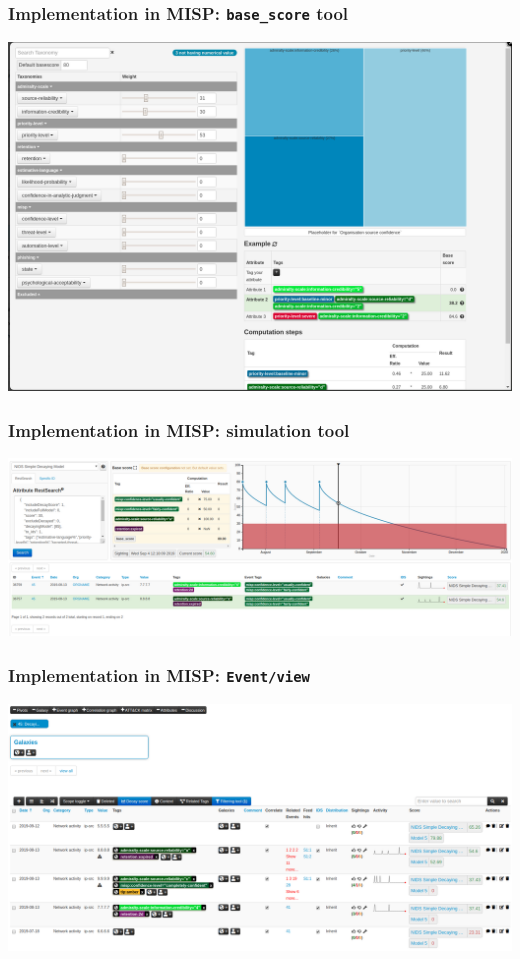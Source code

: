 \begin{frame}
    \frametitle{Implementation in MISP: \texttt{base\_score} tool}
    \includegraphics[width=1.00\linewidth]{pics/decaying-basescore.png}
\end{frame}

\begin{frame}
    \frametitle{Implementation in MISP: simulation tool}
    \includegraphics[width=1.00\linewidth]{pics/decaying-simulation.png}
\end{frame}

\begin{frame}
    \frametitle{Implementation in MISP: \texttt{Event/view}}
    \includegraphics[width=1.00\linewidth]{pics/decaying-event.png}
\end{frame}

